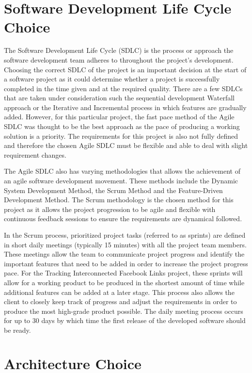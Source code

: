 \documentclass[10pt,onecolumn]{article}
\begin{document}
\section{Software Development Life Cycle Choice}
The Software Development Life Cycle (SDLC) is the process or approach the software development team adheres to throughout the project's development. Choosing the correct SDLC of the project is an important decision at the start of a software project as it could determine whether a project is successfully completed in the time given and at the required quality. There are a few SDLCs that are taken under consideration such the sequential development Waterfall approach or the Iterative and Incremental process in which features are gradually added. However, for this particular project, the fast pace method of the Agile SDLC was thought to be the best approach as the pace of producing a working solution is a priority. The requirements for this project is also not fully defined and therefore the chosen Agile SDLC must be flexible and able to deal with slight requirement changes.

The Agile SDLC also has varying methodologies that allows the achievement of an agile software development movement. These methods include the Dynamic System Development Method, the Scrum Method and the Feature-Driven Development Method. The Scrum methodology is the chosen method for this project as it allows the project progression to be agile and flexible with continuous feedback sessions to ensure the requirements are dynamical followed\cite{Kinsey}.

In the Scrum process, prioritized project tasks (referred to as sprints) are defined in short daily meetings (typically 15 minutes) with all the project team members. These meetings allow the team to communicate project progress and identify the important features that need to be added in order to increase the project progress pace. For the Tracking Interconnected Facebook Links project, these sprints will allow for a working product to be produced in the shortest amount of time while additional features can be  added at a later stage. This process also allows the client to closely keep track of progress and adjust the requirements in order to produce the most high-grade product possible. The daily meeting process occurs for up to 30 days by which time the first release of the developed software should be ready.   


\section{Architecture Choice}
\end{document}
